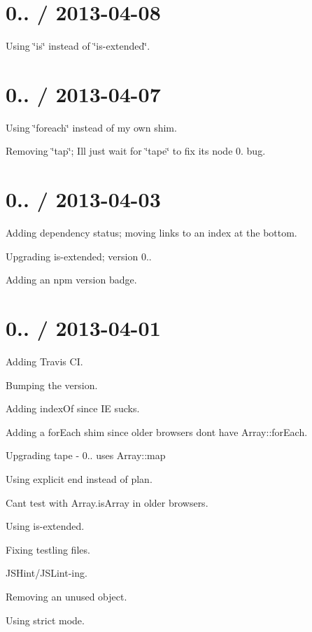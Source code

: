 \section*{0.. / 2013-\/04-\/08 }


\begin{DoxyItemize}
\item Using \char`\"{}is\char`\"{} instead of \char`\"{}is-\/extended\char`\"{}.
\end{DoxyItemize}

\section*{0.. / 2013-\/04-\/07 }


\begin{DoxyItemize}
\item Using \char`\"{}foreach\char`\"{} instead of my own shim.
\item Removing \char`\"{}tap\char`\"{}; I\textquotesingle{}ll just wait for \char`\"{}tape\char`\"{} to fix its node 0. bug.
\end{DoxyItemize}

\section*{0.. / 2013-\/04-\/03 }


\begin{DoxyItemize}
\item Adding dependency status; moving links to an index at the bottom.
\item Upgrading is-\/extended; version 0..
\item Adding an npm version badge.
\end{DoxyItemize}

\section*{0.. / 2013-\/04-\/01 }


\begin{DoxyItemize}
\item Adding Travis CI.
\item Bumping the version.
\item Adding index\+Of since IE sucks.
\item Adding a for\+Each shim since older browsers don\textquotesingle{}t have Array\+::for\+Each.
\item Upgrading tape -\/ 0.. uses Array\+::map
\item Using explicit end instead of plan.
\item Can\textquotesingle{}t test with Array.\+is\+Array in older browsers.
\item Using is-\/extended.
\item Fixing testling files.
\item J\+S\+Hint/\+J\+S\+Lint-\/ing.
\item Removing an unused object.
\item Using strict mode.
\end{DoxyItemize}

